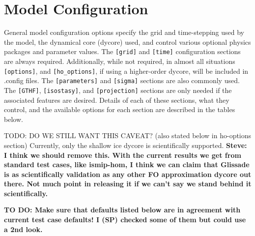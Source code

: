 \section{Model Configuration}\label{ug.sec.config}

General model configuration options 
specify the grid and time-stepping used by the model, 
the dynamical core (dycore) used, 
and control various optional physics packages and parameter values.
The \texttt{[grid]} and \texttt{[time]} configuration sections are always required.
Additionally, while not required, in almost all situations  \texttt{[options]}, 
 and \texttt{[ho\_options]}, if using a higher-order dycore, will be included in .config files.
The \texttt{[parameters]} and \texttt{[sigma]} sections are also commonly used.  
The \texttt{[GTHF]}, \texttt{[isostasy]}, and \texttt{[projection]} sections
are only needed if the associated features are desired.  Details of each of these
sections, what they control, and the available options for each section are described 
in the tables below.

TODO: DO WE STILL WANT THIS CAVEAT? (also stated below in ho-options section) Currently, only the shallow ice dycore is scientifically supported. 
\textbf{Steve: I think we should remove this. With the current results we get from standard test cases, like ismip-hom, I think we can claim that Glissade 
is as scientifically validation as any other FO approximation dycore out there. Not much point in releasing it if we can't say we stand behind it scientifically.}

\textbf{TO DO: Make sure that defaults listed below are in agreement with current test case defaults! I (SP) checked some of them but could use a 2nd look.}

